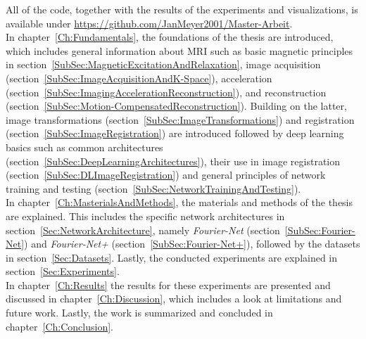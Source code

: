 All of the code, together with the results of the experiments and visualizations, is available under \url{https://github.com/JanMeyer2001/Master-Arbeit}. \\
In chapter~\ref{Ch:Fundamentals}, the foundations of the thesis are introduced, which includes general information about MRI such as basic magnetic principles in section~\ref{SubSec:MagneticExcitationAndRelaxation}, image acquisition (section~\ref{SubSec:ImageAcquisitionAndK-Space}), acceleration (section~\ref{SubSec:ImagingAccelerationReconstruction}), and reconstruction (section~\ref{SubSec:Motion-CompensatedReconstruction}). Building on the latter, image transformations (section~\ref{SubSec:ImageTransformations}) and registration (section~\ref{SubSec:ImageRegistration}) are introduced followed by deep learning basics such as common architectures (section~\ref{SubSec:DeepLearningArchitectures}), their use in image registration (section~\ref{SubSec:DLImageRegistration}) and general principles of network training and testing (section~\ref{SubSec:NetworkTrainingAndTesting}).\\
In chapter~\ref{Ch:MasterialsAndMethods}, the materials and methods of the thesis are explained. This includes the specific network architectures in section~\ref{Sec:NetworkArchitecture}, namely \emph{Fourier-Net} (section~\ref{SubSec:Fourier-Net}) and \emph{Fourier-Net+} (section~\ref{SubSec:Fourier-Net+}), followed by the datasets in section~\ref{Sec:Datasets}.
Lastly, the conducted experiments are explained in section~\ref{Sec:Experiments}.\\
In chapter~\ref{Ch:Results} the results for these experiments are presented and discussed in chapter~\ref{Ch:Discussion}, which includes a look at limitations and future work. Lastly, the work is summarized and concluded in chapter~\ref{Ch:Conclusion}.
